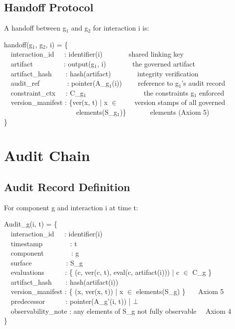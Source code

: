 \subsection{Handoff Protocol}


\begin{cdef}[(Handoff)]
A handoff between g$_1$ and g$_2$ for interaction i is:

\begin{cladnote}
handoff(g$_1$, g$_2$, i) = \{\\
~~interaction\_id~~~: identifier(i)~~~~~~~\textemdash{} shared linking key\\
~~artifact~~~~~~~~~: output(g$_1$, i)~~~~~~~\textemdash{} the governed artifact\\
~~artifact\_hash~~~~: hash(artifact)~~~~~~~\textemdash{} integrity verification\\
~~audit\_ref~~~~~~~~: pointer(A\_g$_1$(i))~~~~\textemdash{} reference to g$_1$'s audit record\\
~~constraint\_ctx~~~: C\_g$_1$~~~~~~~~~~~~~~~~\textemdash{} the constraints g$_1$ enforced\\
~~version\_manifest : \{ver(x, t) | x $\in$~~~~\textemdash{} version stamps of all governed\\
~~~~~~~~~~~~~~~~~~~~~elements(S\_g$_1$)\}~~~~~~~elements (Axiom 5)\\
\}\\
\end{cladnote}
\end{cdef}


\section{Audit Chain}
\label{sec:framework-9}


\subsection{Audit Record Definition}


\begin{cdef}
For component g and interaction i at time t:

\begin{cladnote}
Audit\_g(i, t) = \{\\
~~interaction\_id~~~: identifier(i)\\
~~timestamp~~~~~~~~: t\\
~~component~~~~~~~~: g\\
~~surface~~~~~~~~~~: S\_g\\
~~evaluations~~~~~~: \{ (c, ver(c, t), eval(c, artifact(i))) | c $\in$ C\_g \}\\
~~artifact\_hash~~~~: hash(artifact(i))\\
~~version\_manifest : \{ (x, ver(x, t)) | x $\in$ elements(S\_g) \}~~~\textemdash{} Axiom 5\\
~~predecessor~~~~~~: pointer(A\_g'(i, t)) | $\bot$\\
~~observability\_note : any elements of S\_g not fully observable~~\textemdash{} Axiom 4\\
\}\\
\end{cladnote}
\end{cdef}


